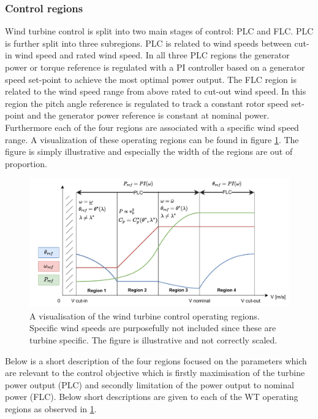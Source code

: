 \subsubsection{Control regions} \label{sec:theyry_ctrl_regions}
Wind turbine control is split into two main stages of control: PLC and FLC. PLC is further split into three subregions. PLC is related to wind speeds between cut-in wind speed and rated wind speed. In all three PLC regions the generator power or torque reference is regulated with a PI controller based on a generator speed set-point to achieve the most optimal power output. The FLC region is related to the wind speed range from above rated to cut-out wind speed. In this region the pitch angle reference is regulated to track a constant rotor speed set-point and the generator power reference is constant at nominal power. Furthermore each of the four regions are associated with a specific wind speed range. A visualization of these operating regions can be found in figure \cref{fig:operating_regions}. The figure is simply illustrative and especially the width of the regions are out of proportion. 
\begin{figure}[ht]
	\centering
	\includegraphics[width=0.9\linewidth]{Graphics/OperatingRegions.pdf}
	\caption{A visualisation of the wind turbine control operating regions. Specific wind speeds are purposefully not included since these are turbine specific. The figure is illustrative and not correctly scaled.}
	\label{fig:operating_regions}
\end{figure}
Below is a short description of the four regions focused on the parameters which are relevant to the control objective which is firstly maximisation of the turbine power output (PLC) and secondly limitation of the power output to nominal power (FLC). Below short descriptions are given to each of the WT operating regions as observed in \cref{fig:operating_regions}.
